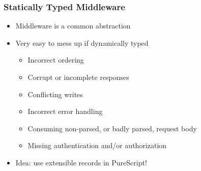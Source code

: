 \begin{frame}
  \frametitle{Statically Typed Middleware}
  \begin{itemize}
    \pause
    \item<+-> Middleware is a common abstraction
    \item<+-> Very easy to mess up if dynamically typed
      \begin{itemize}
        \item<+-> Incorrect ordering
        \item<+-> Corrupt or incomplete responses
        \item<+-> Conflicting writes
        \item<+-> Incorrect error handling
        \item<+-> Consuming non-parsed, or badly parsed, request body
        \item<+-> Missing authentication and/or authorization
      \end{itemize}
    \item<+-> Idea: use extensible records in PureScript!
  \end{itemize}
\end{frame}

{
\begin{frame}[plain]
\end{frame}
}

